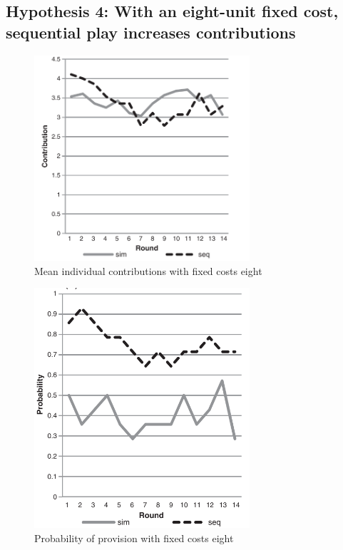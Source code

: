 \documentclass[../root]{subfiles}
\begin{document}
    \subsection{Hypothesis 4: With an eight-unit fixed cost, sequential play increases contributions}

    \begin{figure}[H]
        \centering
        \includegraphics[width = 8cm]{0605kato/h4.png}
        \caption{Mean individual contributions with fixed costs eight}
        \label{hypo4}
    \end{figure}

    \begin{figure}[H]
        \centering
        \includegraphics[width = 8cm]{0605kato/h4_add.png}
        \caption{Probability of provision with fixed costs eight}
        \label{hypo4 add}
    \end{figure}
\end{document}
